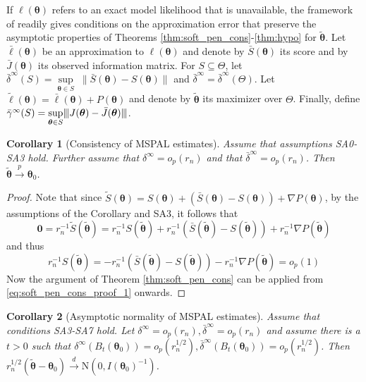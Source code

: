 \documentclass[11pt, a4paper]{article}
\newcommand*{\bb}{\boldsymbol}
\newcommand{\mnorms}[1]{{\vert\kern-0.25ex\vert\kern-0.25ex\vert #1 
		\vert\kern-0.25ex\vert\kern-0.25ex\vert}}
\theoremstyle{example} \newtheorem{example}{Example}[section]
\theoremstyle{theorem} \newtheorem{theorem}{Theorem}[section]
\theoremstyle{theorem }\newtheorem{proposition}{Proposition}[section]
\theoremstyle{theorem }\newtheorem{corollary}{Corollary}[section]
\def\btheta{\bb{\theta}}
\def\b0{\bb{0}}
\def\btnod{\bb{\theta}_0}
\def\bttilde{\tilde{\bb{\theta}}}
\begin{document}
	If $\ell(\btheta)$ refers to an exact model likelihood that is unavailable, the framework of \citet{ogden:2017} readily gives conditions on the approximation error that preserve the asymptotic properties of Theorems \ref{thm:soft_pen_cons}-\ref{thm:hypo} for $\bttilde$. Let $\bar{\ell}(\btheta)$ be an approximation to $\ell(\btheta)$ and denote by $\bar{S}(\btheta)$ its score and by $\bar{J}(\btheta)$ its observed information matrix. For $S\subseteq \Theta$, let $\bar{\delta}^\infty(S) = \underset{\btheta \in S}{\sup} \; \| \bar{S}(\btheta)-S(\btheta)\|$ and $\bar{\delta}^\infty = \bar{\delta}^\infty(\Theta)$. Let $\tilde{\ell}(\btheta) = \bar{\ell}(\btheta)+P(\btheta)$ and denote by $\bttilde$ its maximizer over $\Theta$. Finally, define $\bar{\gamma}^\infty(S) = \underset{\btheta \in S}{\sup} \mnorms{J(\btheta)-\bar{J}(\btheta)}$.
	\begin{corollary}[Consistency of MSPAL estimates] \label{cor:cons}
		Assume that assumptions SA0-SA3 hold. Further assume that $\delta^\infty = o_p(r_n)$ and that $\bar{\delta}^\infty = o_p(r_n)$. Then $\bttilde \overset{p}{\to} \btnod$. 
	\end{corollary}
	\begin{proof}
		Note that since $\tilde{S}(\btheta) = S(\btheta) + (\bar{S}(\btheta)-{S}(\btheta)) + \nabla P(\btheta)$, by the assumptions of the Corollary and SA3, it follows that 
		\begin{equation}
			\b0 = r_n^{-1}\tilde{S}(\bttilde) = r_n^{-1}{S}(\bttilde) + r_n^{-1}(\bar{S}(\bttilde)-{S}(\bttilde)) + r_n^{-1}\nabla P(\bttilde)
		\end{equation}
		and thus 
		\begin{equation}
			r_n^{-1}{S}(\bttilde) = - r_n^{-1}(\bar{S}(\bttilde)-{S}(\bttilde)) - r_n^{-1}\nabla P(\bttilde) = o_p(1)
		\end{equation}
		Now the argument of Theorem \ref{thm:soft_pen_cons} can be applied from \eqref{eq:soft_pen_cons_proof_1} onwards.
	\end{proof}
	\begin{corollary}[Asymptotic normality of MSPAL estimates]\label{cor:asymp_norm}
		Assume that conditions SA3-SA7 hold. Let $\delta^\infty =   o_p(r_n),\bar{\delta}^\infty = o_p(r_n) $ and assume there is a $t>0$ such that $\delta^{\infty}(B_t(\btnod)) = o_p(r_n^{1/2}),\bar{\delta}^{\infty}(B_t(\btnod)) = o_p(r_n^{1/2})$. Then 
		$r_n^{1/2}(\bttilde-\btnod) \overset{d}{\to} \text{N}(0,I(\btnod)^{-1})$. 
	\end{corollary} 
\end{document}
